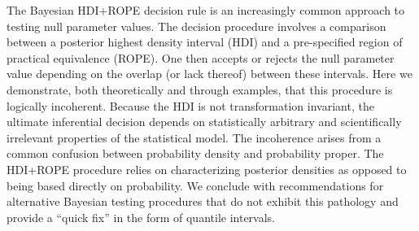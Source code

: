 The Bayesian HDI+ROPE decision rule is an increasingly common approach to testing null parameter values. 
The decision procedure involves a comparison between a posterior highest density interval (HDI) and a pre-specified region of practical equivalence (ROPE). One then accepts or rejects the null parameter value depending on the overlap (or lack thereof) between these intervals. 
Here we demonstrate, both theoretically and through examples, that this procedure is logically incoherent.
Because the HDI is not transformation invariant, the ultimate inferential decision depends on statistically arbitrary and scientifically irrelevant properties of the statistical model.
The incoherence arises from a common confusion between probability density and probability proper.  The HDI+ROPE procedure relies on characterizing posterior densities as opposed to being based directly on probability. 
We conclude with recommendations for alternative Bayesian testing procedures that do not exhibit this pathology and provide a ``quick fix'' in the form of quantile intervals.